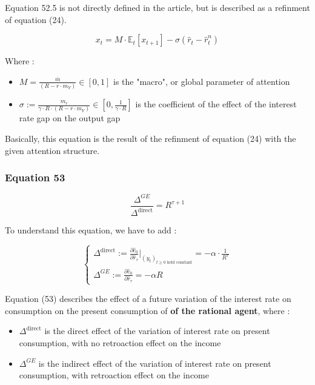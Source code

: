 \documentclass{article}
\begin{document}
Equation 52.5 is not directly defined in the article, but is described as a refinment of equation (24).

\begin{equation*}\tag{52.5}
    x_{t}=M\cdot\mathbb{E}_{t}\left[x_{t+1}\right]-\sigma(\hat{r}_{t}-\hat{r}^{n}_{t})
\end{equation*}

Where : 
\begin{itemize}
    \item $M=\frac{\bar{m}}{(R-r\cdot m_{Y})}\in\left[0,1\right]$ is the "macro", or global parameter of attention
    \item $\sigma:=\frac{m_{r}}{\gamma\cdot R\cdot(R-r\cdot m_{Y})}\in\left[0,\frac{1}{\gamma\cdot R}\right]$ is the coefficient of the effect of the interest rate gap on the output gap
\end{itemize}

Basically, this equation is the result of the refinment of equation (24) with the given attention structure.

\subsubsection*{Equation 53}

\begin{equation}\tag{53}
    \frac{\Delta^{GE}}{\Delta^{\text{direct}}}=R^{\tau+1}
\end{equation}

To understand this equation, we have to add : 

\begin{equation*}
    \begin{cases}
        \Delta^{\text{direct}}:=\frac{\partial \hat{c}_{0}}{\partial \hat{r}_{\tau}}\bigg\rvert_{(y_{t})_{t\geq0 \text{ held constant}}} = -\alpha\cdot \frac{1}{R^{\tau}} \\
        \Delta^{GE}:=\frac{\partial \hat{c}_{0}}{\partial \hat{r}_{\tau}}=-\alpha R 
    \end{cases}
\end{equation*}

Equation (53) describes the effect of a future variation of the interest rate on consumption on the present consumption of \textbf{of the rational agent}, where :

\begin{itemize}
    \item $\Delta^{\text{direct}}$ is the direct effect of the variation of interest rate on present consumption, with no retroaction effect on the income
    \item $\Delta^{GE}$ is the indirect effect of the variation of interest rate on present consumption, with retroaction effect on the income
\end{itemize}
\end{document}
